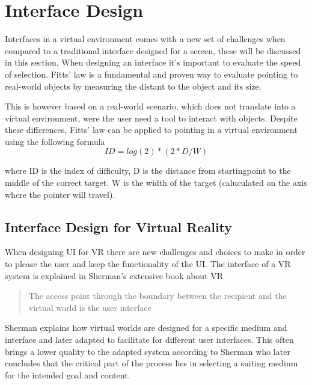 \section{Interface Design}
\label{theory:interface-design}
Interfaces in a virtual environment comes with a new set of challenges when compared to a traditional interface designed for a screen, these will be discussed in this section.
When designing an interface it's important to evaluate the speed of selection. Fitts' law is a fundamental and proven way to evaluate pointing to real-world objects by measuring the distant to the object and its size\cite{interface:Fitts1954}.

This is however based on a real-world scenario, which does not translate into a virtual environment, were the user need a tool to interact with objects. Despite these differences, Fitts' law can be applied to pointing in a virtual environment using the following formula  \cite{interface:card1978evaluation}
\begin{equation}
ID = log(2) * ( 2 * D / W )
\end{equation}

where ID is the index of difficulty, D is the distance from startingpoint to the middle of the correct target. W is the width of the target (caluculated on the axis where the pointer will travel).

\subsection{Interface Design for Virtual Reality}
When designing UI for VR there are new challenges and choices to make in order to please the user and keep the functionality of the UI. The interface of a VR system is explained in Sherman's extensive book about VR\cite{interface:sherman2002understanding}
 \begin{quote}
   The access point through the boundary between the recipient and the virtual world is the user interface
 \end{quote}
 Sherman explains how virtual worlds are designed for a specific medium and interface and later adapted to facilitate for different user interfaces. This often brings a lower quality to the adapted system according to Sherman who later concludes that the critical part of the process lies in selecting a suiting medium for the intended goal and content\cite{interface:sherman2002understanding}.

